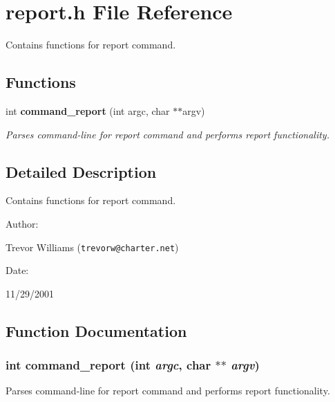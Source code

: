 \section{report.h File Reference}
\label{report_8h}
Contains functions for report command. 


\subsection*{Functions}
\begin{CompactItemize}
\item 
int {\bf command\_\-report} (int argc, char $\ast$$\ast$argv)
\begin{CompactList}\small\item\em Parses command-line for report command and performs report functionality.\item\end{CompactList}\end{CompactItemize}


\subsection{Detailed Description}
Contains functions for report command.



\begin{Desc}
\item[Author: ]\par
Trevor Williams ({\tt trevorw@charter.net}) \end{Desc}
\begin{Desc}
\item[Date: ]\par
11/29/2001\end{Desc}


\subsection{Function Documentation}
\subsubsection{\setlength{\rightskip}{0pt plus 5cm}int command\_\-report (int {\em argc}, char $\ast$$\ast$ {\em argv})}\label{report_8h_a0}


Parses command-line for report command and performs report functionality.

